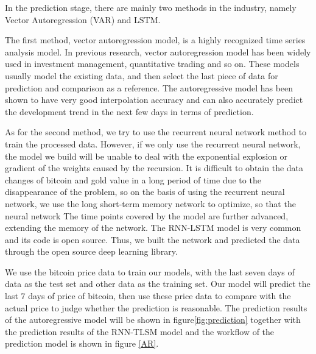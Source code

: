 \documentclass{mcmthesis}
\begin{document}
In the prediction stage, there are mainly two methods in the industry, namely Vector Autoregression (VAR) and LSTM.

The first method, vector autoregression model, is a highly recognized time series analysis model. In previous research, vector autoregression model has been widely used in investment management, quantitative trading and so on. These models usually model the existing data, and then select the last piece of data for prediction and comparison as a reference. The autoregressive model has been shown to have very good interpolation accuracy and can also accurately predict the development trend in the next few days in terms of prediction.

As for the second method, we try to use the recurrent neural network method to train the processed data. However, if we only use the recurrent neural network, the model we build will be unable to deal with the exponential explosion or gradient of the weights caused by the recursion. It is difficult to obtain the data changes of bitcoin and gold value in a long period of time due to the disappearance of the problem, so on the basis of using the recurrent neural network, we use the long short-term memory network to optimize, so that the neural network The time points covered by the model are further advanced, extending the memory of the network. The RNN-LSTM model is very common and its code is open source. Thus, we built the network and predicted the data through the open source deep learning library. 

We use the bitcoin price data to train our models, with the last seven days of data as the test set and other data as the training set. Our model will predict the last 7 days of price of bitcoin, then use these price data to compare with the actual price to judge whether the prediction is reasonable. The prediction results of the autoregressive model will be shown in figure\ref{fig:prediction} together with the prediction results of the RNN-TLSM model and the workflow of the prediction model is shown in figure \ref{AR}.
\end{document}
